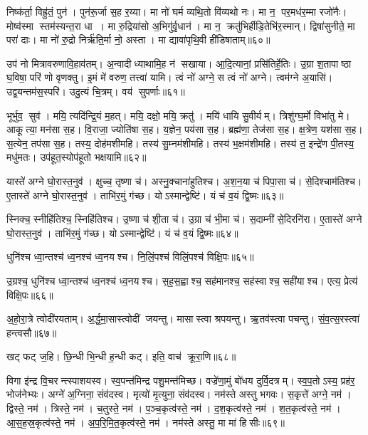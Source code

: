 निष्क॑र्ता॒ विह्रु॑तं॒ पुन॑। पुन॑रू॒र्जा स॒ह र॒य्या। मा नो॑ घर्म व्यथि॒तो वि॑व्यथो नः। मा न॒ पर॒मध॑र॒म्मा रजो॑नैः। मोष्व॑स्मा स्तम॑स्यन्त॒रा धा। मा रु॒द्रिया॑सो अ॒भिगु॑र्वृ॒धान॑। मा न॒ क्रतु॑भिर्\mbox{}हीडि॒तेभि॑र॒स्मान्। द्विषा॑सुनीते॒ मा परा॑ दाः। मा नो॑ रु॒द्रो निर्\mbox{}ऋ॑ति॒र्मा नो॒ अस्ता। मा द्यावा॑पृथि॒वी ही॑डिषाताम्॥६०॥

उप॑ नो मित्रावरुणावि॒हाव॑तम्। अ॒न्वादीध्याथामि॒ह न॑ सखाया। आ॒दि॒त्यानां॒ प्रसि॑तिर्\mbox{}हे॒तिः। उ॒ग्रा श॒तापाष्ठा घ॒विषा॒ परि॑ णो वृणक्तु। इ॒मं मे॑ वरुण॒ तत्त्वा॑ यामि। त्वं नो॑ अग्ने॒ स त्वं नो॑ अग्ने। त्वम॑ग्ने अ॒यासि॑। उद्व॒यन्तम॑स॒स्परि॑। उदु॒त्यं चि॒त्रम्। वय॑ सुपर्णाः॥६१॥
\anuvakamend[पु॒रो॒वसु॑र्\mbox{}हीडिषाता सुप॒र्णाः]


भूर्भुव॒ सुव॑। मयि॒ त्यदि॑न्द्रि॒यं म॒हत्। मयि॒ दक्षो॒ मयि॒ क्रतु॑। मयि॑ धायि सु॒वीर्यम्। त्रिशु॑ग्घ॒र्मो विभा॑तु मे। आकूत्या॒ मन॑सा स॒ह। वि॒राजा॒ ज्योति॑षा स॒ह। य॒ज्ञेन॒ पय॑सा स॒ह। ब्रह्म॑णा॒ तेज॑सा स॒ह। क्ष॒त्रेण॒ यश॑सा स॒ह। स॒त्येन॒ तप॑सा स॒ह। तस्य॒ दोह॑मशीमहि। तस्य॑ सु॒म्नम॑शीमहि। तस्य॑ भ॒क्षम॑शीमहि। तस्य॑ त॒ इन्द्रे॑ण पी॒तस्य॒ मधु॑मतः। उप॑हूत॒स्योप॑हूतो भक्षयामि॥६२॥
\anuvakamend[यश॑सा स॒ह षट्च॑]

यास्ते॑ अग्ने घो॒रास्त॒नुव॑। क्षुच्च॒ तृष्णा च॑। अस्नु॒क्चाना॑हुतिश्च। अ॒श॒न॒या च॑ पिपा॒सा च॑। से॒दिश्चाम॑तिश्च। ए॒तास्ते॑ अग्ने घो॒रास्त॒नुव॑। ताभि॑र॒मुं ग॑च्छ। योऽस्मान्द्वेष्टि॑। यं च॑ व॒यं द्वि॒ष्मः॥६३॥
\anuvakamend

स्निक्च॒ स्नीहि॑तिश्च॒ स्निहि॑तिश्च। उ॒ष्णा च॑ शी॒ता च॑। उ॒ग्रा च॑ भी॒मा च॑। स॒दाम्नी॑ से॒दिरनि॑रा। ए॒तास्ते॑ अग्ने घो॒रास्त॒नुव॑। ताभि॑र॒मुं ग॑च्छ। योऽस्मान्द्वेष्टि॑। यं च॑ व॒यं द्वि॒ष्मः॥६४॥
\anuvakamend

धुनि॑श्च ध्वा॒न्तश्च॑ ध्व॒नश्च॑ ध्व॒नयश्च। नि॒लिं॒पश्च॑ विलिं॒पश्च॑ विक्षि॒पः॥६५॥
\anuvakamend

उ॒ग्रश्च॒ धुनि॑श्च ध्वा॒न्तश्च॑ ध्व॒नश्च॑ ध्व॒नयश्च। स॒ह॒स॒ह्वाश्च॒ सह॑मानश्च॒ सह॑स्वाश्च॒ सही॑याश्च। एत्य॒ प्रेत्य॑ विक्षि॒पः॥६६॥
\anuvakamend


अ॒हो॒रा॒त्रे त्वोदी॑रयताम्। अ॒र्द्ध॒मा॒सास्त्वोदीं जयन्तु। मासास्त्वा श्रपयन्तु। ऋ॒तव॑स्त्वा पचन्तु। सं॒व॒त्स॒रस्त्वा॑ हन्त्वसौ॥६७॥
\anuvakamend

खट् फट् ज॒हि। छि॒न्धी भि॒न्धी ह॒न्धी कट्। इति॒ वाच॑ क्रूरा॒णि॥६८॥
\anuvakamend

विगा इ॑न्द्र वि॒चरन्त्स्पाशयस्व। स्व॒पन्त॑मिन्द्र पशु॒मन्त॑मिच्छ। वज्रे॑णा॒मुं बो॑धय दुर्वि॒दत्रम्। स्व॒प॒तोऽस्य॒ प्रह॑र॒ भोज॑नेभ्यः। अग्ने॑ अ॒ग्निना॒ संव॑दस्व। मृत्यो॑ मृ॒त्युना॒ संव॑दस्व। नम॑स्ते अस्तु भगवः। स॒कृत्ते॑ अग्ने॒ नम॑। द्विस्ते॒ नम॑। त्रिस्ते॒ नम॑। च॒तुस्ते॒ नम॑। प॒ञ्च॒कृत्व॑स्ते॒ नम॑। द॒श॒कृत्व॑स्ते॒ नम॑। श॒त॒कृत्व॑स्ते॒ नम॑। आ॒स॒ह॒स्र॒कृत्व॑स्ते॒ नम॑। अ॒प॒रि॒मि॒त॒कृत्व॑स्ते॒ नम॑। नम॑स्ते अस्तु॒ मा मा॑ हिसीः॥६९॥
\anuvakamend[त्रिस्ते॒ नम॑ स॒प्त च॑]

